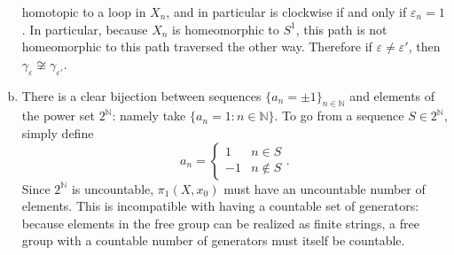 \documentclass{article}
\newenvironment{solution}[1][Solution.]{\begin{trivlist}
\item[\hskip \labelsep {\bfseries #1}]}{\end{trivlist}}
\begin{document}
\begin{solution}
\begin{enumerate}[a.]
      homotopic to a loop in $X_n$, and in particular is clockwise if and only if
      $\varepsilon_n = 1$. In particular, because $X_n$ is homeomorphic to $S^1$,
      this path is not homeomorphic to this path traversed the other way.
      Therefore if $\varepsilon \neq \varepsilon'$, then
      $\gamma_\varepsilon \not\cong \gamma_{\varepsilon'}$.
    \item There is a clear bijection between sequences
    $\{ a_n = \pm 1 \}_{n \in \mathbb N}$ and elements of the power set
    $2^\mathbb{N}$: namely take $\{ a_n = 1 : n \in \mathbb N \}$. To go from
    a sequence $S \in 2^\mathbb N$, simply define \[
      a_n = \begin{cases}
        1 & n \in S \\
        -1 & n \not\in S
      \end{cases}.
    \] Since $2^\mathbb N$ is uncountable, $\pi_1(X, x_0)$ must have an
    uncountable number of elements. This is incompatible with having a
    countable set of generators: because elements in the free group can be
    realized as finite strings, a free group with a countable number of
    generators must itself be countable.
  \end{enumerate}
\end{solution}
\end{document}
